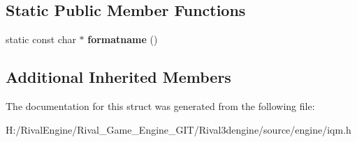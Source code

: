 \subsection*{Static Public Member Functions}
\begin{DoxyCompactItemize}
\item 
\mbox{\label{structiqm_a10b831073cedaffe314afb158d14f491}} 
static const char $\ast$ {\bfseries formatname} ()
\end{DoxyCompactItemize}
\subsection*{Additional Inherited Members}


The documentation for this struct was generated from the following file\+:\begin{DoxyCompactItemize}
\item 
H\+:/\+Rival\+Engine/\+Rival\+\_\+\+Game\+\_\+\+Engine\+\_\+\+G\+I\+T/\+Rival3dengine/source/engine/iqm.\+h\end{DoxyCompactItemize}
